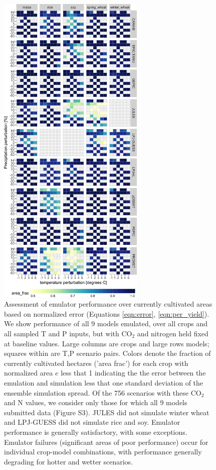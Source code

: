 \documentclass[gmd, manuscript]{copernicus} %
\begin{document}
\begin{figure}[ht]
\centering
    \includegraphics[width=7cm]{figures/error_360.png}
    \caption{Assessment of emulator performance over currently cultivated areas based on normalized error (Equations \ref{eqn:error}, \ref{eqn:per_yield}). We show performance of all 9 models emulated, over all crops and all sampled T and P inputs, but with CO$_2$ and nitrogen held fixed at baseline values. Large columns are crops and large rows models; squares within are T,P scenario pairs. Colors denote the fraction of currently cultivated hectares ('area frac') for each crop with normalized area $e$ less that 1 indicating the the error between the emulation and simulation less that one standard deviation of the ensemble simulation spread. Of the 756 scenarios with these CO$_2$ and N values, we consider only those for which all 9 models submitted data (Figure S3). JULES did not simulate winter wheat and LPJ-GUESS did not simulate rice and soy. Emulator performance is generally satisfactory, with some exceptions. Emulator failures (significant areas of poor performance) occur for individual crop-model combinations, with performance generally degrading for hotter and wetter scenarios.}
   \label{fig:error_360}
\end{figure}
\end{document}
